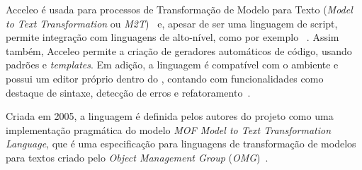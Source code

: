 Acceleo é usada para processos de Transformação de Modelo para Texto (\textit{Model to Text Transformation} ou \textit{M2T})~\cite{acceleouserguide} e, apesar de ser uma linguagem de script, permite integração com linguagens de alto-nível, como por exemplo \java~\cite{mtsweni2012exploiting}. Assim também, Acceleo permite a criação de geradores automáticos de código, usando padrões e \textit{templates}. Em adição, a linguagem é compatível com o ambiente \eclipse e possui um editor próprio dentro do \framework, contando com funcionalidades como destaque de sintaxe, detecção de erros e refatoramento~\cite{WikiAcceleo}. 

Criada em 2005, a linguagem é definida pelos autores do projeto como uma implementação pragmática do modelo \textit{MOF Model to Text Transformation Language}, que é uma especificação para linguagens de transformação de modelos para textos criado pelo \textit{Object Management Group} (\textit{OMG})~\cite{SiteAcceleo}.

